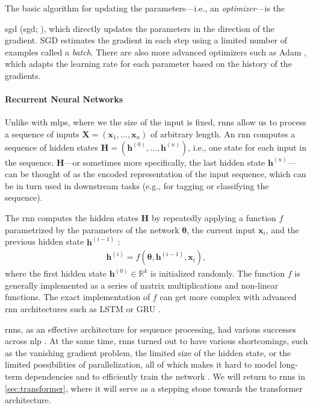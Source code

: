 The basic algorithm for updating the parameters---i.e., an \emph{optimizer}---is the {\acl{sgd} (\acs{sgd}; \citealp[p.~275]{goodfellow2016deep}), which directly updates the parameters in the direction of the gradient. SGD estimates the gradient in each step using a limited number of examples called a \emph{batch}. There are also more advanced optimizers such as Adam \cite{kingma2014adam}, which adapts the learning rate for each parameter based on the history of the gradients.

\paragraph{Recurrent Neural Networks} Unlike with \acp{mlp}, where we the size of the input is fixed, \acp{rnn} allow us to process a sequence of inputs $\mathbf{X} = (\mathbf{x}_1, \ldots, \mathbf{x}_n)$ of arbitrary length. An \ac{rnn} computes a sequence of hidden states $\mathbf{H} = (\mathbf{h}^{(0)}, \ldots, \mathbf{h}^{(n)})$, i.e., one state for each input in the sequence. $\mathbf{H}$---or sometimes more specifically, the last hidden state $\mathbf{h}^{(n)}$---can be thought of as the encoded representation of the input sequence, which can be in turn used in downstream tasks (e.g., for tagging or classifying the sequence).

The \ac{rnn} computes the hidden states $\mathbf{H}$ by repeatedly applying a function $f$ parametrized by the parameters of the network $\boldsymbol{\theta}$, the current input $\mathbf{x}_i$, and the previous hidden state $\mathbf{h}^{(i-1)}$ \cite[p.~367]{goodfellow2016deep}:
\begin{align}
    \mathbf{h}^{(i)} = f(\boldsymbol{\theta}, \mathbf{h}^{(i-1)}, \mathbf{x}_i),
\end{align}
where the first hidden state $\mathbf{h}^{(0)} \in \mathbb{R}^k$ is initialized randomly.  The function $f$ is generally implemented as a series of matrix multiplications and non-linear functions. The exact implementation of $f$ can get more complex with advanced \ac{rnn} architectures such as LSTM \cite{hochreiter1997long} or GRU \cite{cho2014learning}.

\acp{rnn}, as an effective architecture for sequence processing, had various successes across \ac{nlp} \cite{karpathy2015unreasonable,salehinejad2017recent}. At the same time, \acp{rnn} turned out to have various shortcomings, such as the vanishing gradient problem, the limited size of the hidden state, or the limited possibilities of parallelization, all of which makes it hard to model long-term dependencies and to efficiently train the network \cite{hochreiter1998vanishing,pascanu2013difficulty}. We will return to \acp{rnn} in \autoref{sec:transformer}, where it will serve as a stepping stone towards the transformer architecture.


}
